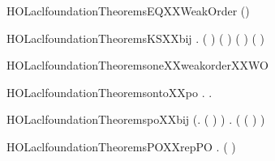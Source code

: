 \begin{SaveVerbatim}{HOLaclfoundationTheoremsEQXXWeakOrder}
\HOLTokenTurnstile{}  (\HOLSymConst{=})
\end{SaveVerbatim}
\newcommand{\HOLaclfoundationTheoremsEQXXWeakOrder}{\UseVerbatim{HOLaclfoundationTheoremsEQXXWeakOrder}}
\begin{SaveVerbatim}{HOLaclfoundationTheoremsKSXXbij}
\HOLTokenTurnstile{} \HOLSymConst{\HOLTokenForall{}}.  \HOLSymConst{=}  ( ) ( ) ( ) ( )
\end{SaveVerbatim}
\newcommand{\HOLaclfoundationTheoremsKSXXbij}{\UseVerbatim{HOLaclfoundationTheoremsKSXXbij}}
\begin{SaveVerbatim}{HOLaclfoundationTheoremsoneXXweakorderXXWO}
\HOLTokenTurnstile{}  
\end{SaveVerbatim}
\newcommand{\HOLaclfoundationTheoremsoneXXweakorderXXWO}{\UseVerbatim{HOLaclfoundationTheoremsoneXXweakorderXXWO}}
\begin{SaveVerbatim}{HOLaclfoundationTheoremsontoXXpo}
\HOLTokenTurnstile{} \HOLSymConst{\HOLTokenForall{}}.   \HOLSymConst{\HOLTokenEquiv{}} \HOLSymConst{\HOLTokenExists{}}.  \HOLSymConst{=}  
\end{SaveVerbatim}
\newcommand{\HOLaclfoundationTheoremsontoXXpo}{\UseVerbatim{HOLaclfoundationTheoremsontoXXpo}}
\begin{SaveVerbatim}{HOLaclfoundationTheoremspoXXbij}
\HOLTokenTurnstile{} (\HOLSymConst{\HOLTokenForall{}}.  ( ) \HOLSymConst{=} ) \HOLSymConst{\HOLTokenConj{}}
   \HOLSymConst{\HOLTokenForall{}}.   \HOLSymConst{\HOLTokenEquiv{}} ( ( ) \HOLSymConst{=} )
\end{SaveVerbatim}
\newcommand{\HOLaclfoundationTheoremspoXXbij}{\UseVerbatim{HOLaclfoundationTheoremspoXXbij}}
\begin{SaveVerbatim}{HOLaclfoundationTheoremsPOXXrepPO}
\HOLTokenTurnstile{} \HOLSymConst{\HOLTokenForall{}}.  ( ) \HOLSymConst{=} 
\end{SaveVerbatim}
